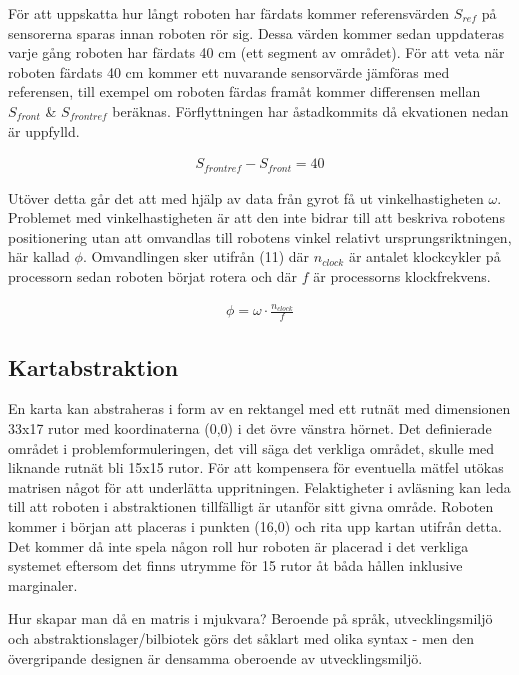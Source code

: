 \documentclass[a4paper,12pt,fleqn]{article}
\begin{document}
För att uppskatta hur långt roboten har färdats kommer referensvärden $S_{ref}$ på sensorerna sparas innan roboten rör sig. Dessa värden kommer sedan uppdateras varje gång roboten har färdats 40 cm (ett segment av området). För att veta när roboten färdats 40 cm kommer ett nuvarande sensorvärde jämföras med referensen, till exempel om roboten färdas framåt kommer differensen mellan $S_{front}$ \& $S_{frontref}$ beräknas. Förflyttningen har åstadkommits då ekvationen nedan är uppfylld. 

\begin{gather}
	S_{frontref} - S_{front} = 40
\end{gather}

Utöver detta går det att med hjälp av data från gyrot få ut vinkelhastigheten $\omega$. Problemet med vinkelhastigheten är att den inte bidrar till att beskriva robotens positionering utan att omvandlas till robotens vinkel relativt ursprungsriktningen, här kallad $\phi$. Omvandlingen sker utifrån (11) där $n_{clock}$ är antalet klockcykler på processorn sedan roboten börjat rotera och där $f$ är processorns klockfrekvens.

\begin{gather}
	\phi = \omega \cdot \frac{n_{clock}}{f}
\end{gather} 

\subsection{Kartabstraktion}

En karta kan abstraheras i form av en rektangel med ett rutnät med dimensionen 33x17 rutor med koordinaterna (0,0) i det övre vänstra hörnet. Det definierade området i problemformuleringen, det vill säga det verkliga området, skulle med liknande rutnät bli 15x15 rutor. För att kompensera för eventuella mätfel utökas matrisen något för att underlätta uppritningen. Felaktigheter i avläsning kan leda till att roboten i abstraktionen tillfälligt är utanför sitt givna område. Roboten kommer i början att placeras i punkten (16,0) och rita upp kartan utifrån detta. Det kommer då inte spela någon roll hur roboten är placerad i det verkliga systemet eftersom det finns utrymme för 15 rutor åt båda hållen inklusive marginaler. 

Hur skapar man då en matris i mjukvara? Beroende på språk, utvecklingsmiljö och abstraktionslager/bilbiotek görs det såklart med olika syntax - men den övergripande designen är densamma oberoende av utvecklingsmiljö. 
\end{document}
